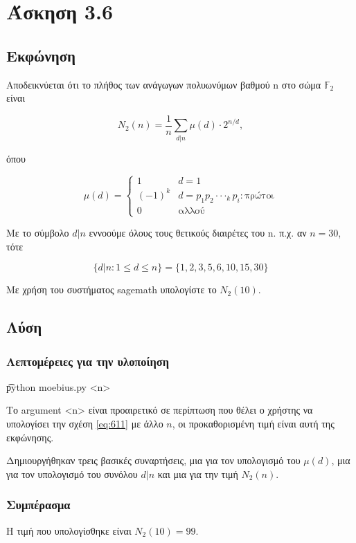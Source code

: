 \section{Άσκηση 3.6}

\subsection{Εκφώνηση}

Αποδεικνύεται ότι το πλήθος των ανάγωγων πολυωνύμων βαθμού n στο σώμα $\mathbb{F}_2$ είναι

\begin{equation}\label{eq:611}
    N_2(n) = \frac{1}{n} \sum_{d|n}\mu(d) \cdot 2^{n/d},
\end{equation}

όπου

\begin{equation}
    \mu(d) = 
    \begin{cases}
      1 & d = 1 \\
      (-1)^k & d = p_1p_2\cdot\cdot\cdotp_k p_i :\text{πρώτοι}\\
      0 & \text{αλλού}
    \end{cases}
\end{equation}

Με το σύμβολο $d|n$ εννοούμε όλους τους θετικούς διαιρέτες του n. π.χ. αν $n = 30$, τότε

\begin{equation}
    \{d|n: 1 \le d \le n\} = \{1, 2, 3, 5, 6, 10, 15, 30\}
\end{equation}

Με χρήση του συστήματος sagemath υπολογίστε το $N_2(10)$.

\subsection{Λύση} 

\subsubsection{Λεπτομέρειες για την υλοποίηση}

\begin{center}
    \t{python moebius.py <n>}
\end{center}

Το argument <n> είναι προαιρετικό σε περίπτωση που θέλει ο χρήστης να υπολογίσει την σχέση \ref{eq:611} με άλλο $n$, οι προκαθορισμένη τιμή είναι αυτή της εκφώνησης.

Δημιουργήθηκαν τρεις βασικές συναρτήσεις, μια για τον υπολογισμό του $μ(d)$, μια για τον υπολογισμό του συνόλου $d|n$ και μια για την τιμή $ N_2(n)$.

\subsubsection{Συμπέρασμα}

Η τιμή που υπολογίσθηκε είναι $N_2(10) = 99$.
